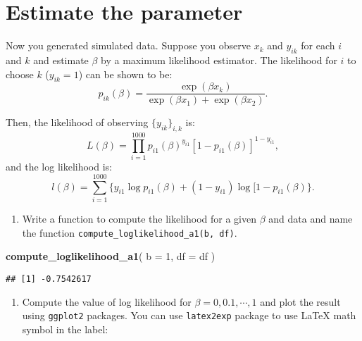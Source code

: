 \documentclass[
]{book}
\newenvironment{Shaded}{\begin{snugshade}}{\end{snugshade}}
\newcommand{\AttributeTok}[1]{\textcolor[rgb]{0.13,0.29,0.53}{#1}}
\newcommand{\DecValTok}[1]{\textcolor[rgb]{0.00,0.00,0.81}{#1}}
\newcommand{\FunctionTok}[1]{\textcolor[rgb]{0.13,0.29,0.53}{\textbf{#1}}}
\newcommand{\NormalTok}[1]{#1}
\providecommand{\tightlist}{%
  \setlength{\itemsep}{0pt}\setlength{\parskip}{0pt}}
\begin{document}
\hypertarget{estimate-the-parameter}{%
\section{Estimate the parameter}\label{estimate-the-parameter}}

Now you generated simulated data. Suppose you observe \(x_k\) and \(y_{ik}\) for each \(i\) and \(k\) and estimate \(\beta\) by a maximum likelihood estimator. The likelihood for \(i\) to choose \(k\) (\(y_{ik} = 1\)) can be shown to be:
\[
p_{ik}(\beta) = \frac{\exp(\beta x_k)}{\exp(\beta x_1) + \exp(\beta x_2)}.
\]

Then, the likelihood of observing \(\{y_{ik}\}_{i, k}\) is:
\[
L(\beta) = \prod_{i = 1}^{1000} p_{i1}(\beta)^{y_{i1}} [1 - p_{i1}(\beta)]^{1 - y_{i1}},
\]
and the log likelihood is:
\[
l(\beta) = \sum_{i = 1}^{1000}\{y_{i1}\log p_{i1}(\beta) + (1 - y_{i1})\log [1 - p_{i1}(\beta)\}.
\]

\begin{enumerate}
\def\labelenumi{\arabic{enumi}.}
\tightlist
\item
  Write a function to compute the likelihood for a given \(\beta\) and data and name the function \texttt{compute\_loglikelihood\_a1(b,\ df)}.
\end{enumerate}

\begin{Shaded}
\begin{Highlighting}[]
\FunctionTok{compute\_loglikelihood\_a1}\NormalTok{(}
    \AttributeTok{b =} \DecValTok{1}\NormalTok{,}
    \AttributeTok{df =}\NormalTok{ df}
\NormalTok{  ) }
\end{Highlighting}
\end{Shaded}

\begin{verbatim}
## [1] -0.7542617
\end{verbatim}

\begin{enumerate}
\def\labelenumi{\arabic{enumi}.}
\tightlist
\item
  Compute the value of log likelihood for \(\beta = 0, 0.1, \cdots, 1\) and plot the result using \texttt{ggplot2} packages. You can use \texttt{latex2exp} package to use LaTeX math symbol in the label:
\end{enumerate}
\end{document}
